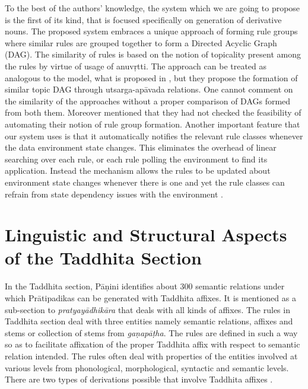\documentclass[a4paper,11pt,twoside,openright]{report}
\begin{document}
To the best of the authors' knowledge, the system which we are going to propose is the first of its kind, that is focused specifically on generation of  derivative nouns. The proposed system embraces a unique approach of forming rule groups where similar rules are grouped together to form a Directed Acyclic Graph (DAG). The similarity of rules is based on the notion of topicality present among the rules by virtue of usage of anuvṛtti. The approach can be treated as analogous to the model, what is proposed in , but they propose the formation of similar topic DAG through utsarga-apāvada relations. One cannot comment on the similarity of the approaches without a proper comparison of DAGs formed from both them. Moreover  mentioned that they had not checked the feasibility of automating their notion of rule group formation. Another important feature that our system uses is that it automatically notifies the relevant rule classes whenever the data environment state changes. This eliminates the overhead of linear searching over each rule, or each rule polling the environment to find its application. Instead the mechanism allows the rules to be updated about environment state changes whenever there is one and yet the rule classes can refrain from state dependency issues with the environment  \cite{szallies1997using}.  







 
\chapter{Linguistic and Structural Aspects of the Taddhita Section}
\label{chapter 3}

In the Taddhita section, Pāṇini identifies about 300 semantic relations under which Prātipadikas can be generated with Taddhita affixes. It is mentioned as a sub-section to \textsl{ pratyayādhikāra} that deals with all kinds of affixes. The rules in Taddhita section deal with three entities namely semantic relations, affixes and stems or collection of stems from \textsl{ gaṇapāṭha}. The rules are defined in such a way so as to facilitate affixation of the proper Taddhita affix with respect to semantic relation intended. The rules often deal with properties of the entities involved at various levels from phonological, morphological, syntactic and semantic levels. There are two types of derivations possible that involve Taddhita affixes \cite{rsbook}.
\end{document}
